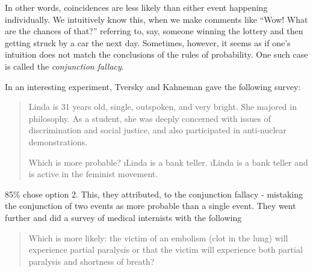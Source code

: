 In other words, coincidences are less likely than either event happening individually.  We intuitively know this, when we make comments like ``Wow! What are the chances of that?'' referring to, say, someone winning the lottery and then getting struck by a car the next day.  Sometimes, however, it seems as if one's intuition does not match the conclusions of the rules of probability.  One such case is called the {\em conjunction fallacy}.

In an interesting experiment, Tversky and Kahneman\citep{tversky1983extensional} gave the following survey:


\begin{quote}Linda is 31 years old, single, outspoken, and very bright. She majored in philosophy. As a student, she was deeply concerned with issues of discrimination and social justice, and also participated in anti-nuclear demonstrations.

Which is more probable?
\be
\i Linda is a bank teller.
\i Linda is a bank teller and is active in the feminist movement.
\ee
\end{quote}
85\% chose option 2.\citep{tversky1974judgment}  This, they attributed, to the conjunction fallacy - mistaking the conjunction of two events as more probable than a single event.  They went further and did a survey of medical internists with the following
\begin{quote}
Which is more likely: the victim of an embolism (clot in the lung) will experience partial paralysis or that the victim will experience both partial paralysis and shortness of breath?
\end{quote}

